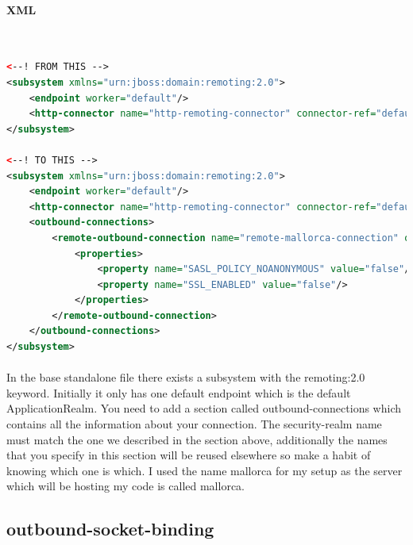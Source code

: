 \documentclass[
10pt, %
letterpaper, %
oneside, %
headinclude,footinclude, %
BCOR5mm, %
]{scrartcl}
\begin{document}

\paragraph{XML}~
\begin{lstlisting}[language=XML]
<--! FROM THIS -->
<subsystem xmlns="urn:jboss:domain:remoting:2.0">
	<endpoint worker="default"/>
	<http-connector name="http-remoting-connector" connector-ref="default" security-realm="ApplicationRealm"/>
</subsystem>

<--! TO THIS -->
<subsystem xmlns="urn:jboss:domain:remoting:2.0">
	<endpoint worker="default"/>
	<http-connector name="http-remoting-connector" connector-ref="default" security-realm="ApplicationRealm"/>
	<outbound-connections>
		<remote-outbound-connection name="remote-mallorca-connection" outbound-socket-binding-ref="remote-mallorca" username="uwe" security-realm="ejb-security-realm" protocol="http-remoting">
			<properties>
				<property name="SASL_POLICY_NOANONYMOUS" value="false"/>
				<property name="SSL_ENABLED" value="false"/>
			</properties>
		</remote-outbound-connection>
	</outbound-connections>
</subsystem>
\end{lstlisting}


\paragraph{} In the base standalone file there exists a subsystem with the remoting:2.0 keyword. Initially it only has one default endpoint which is the default ApplicationRealm. You need to add a section called outbound-connections which contains all the information about your connection. The security-realm name must match the one we described in the section above, additionally the names that you specify in this section will be reused elsewhere so make a habit of knowing which one is which. I used the name mallorca for my setup as the server which will be hosting my code is called mallorca.


\subsection{outbound-socket-binding}

\end{document}
